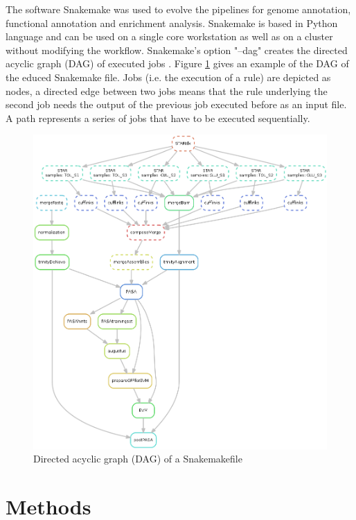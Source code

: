 \documentclass[12pt, a4paper]{report}
\begin{document}
The software Snakemake was used to evolve the pipelines for genome annotation, functional annotation and enrichment analysis. Snakemake is based in Python language and can be used on a single core workstation as well as on a cluster without modifying the workflow. 
Snakemake's option "--dag" creates the directed acyclic graph (DAG) of executed jobs \cite{Koster2012}.   
\newline
Figure \ref{fig:DAG} gives an example of the DAG of the educed Snakemake file. Jobs (i.e. the execution of a rule) are depicted as nodes, a directed edge between two jobs means that the rule underlying the second job needs the output of the previous job executed before as an input file. A path represents a series of jobs that have to be executed sequentially.
\begin{figure}[H]
	\centering	
	\includegraphics[width=430pt]{pics/DAG.png}
	\caption[Directed acyclic graph (DAG)]
	{Directed acyclic graph (DAG) of a Snakemakefile}
	\label{fig:DAG}
\end{figure}

\newpage
\setcounter{chapter}{2}\setcounter{section}{0}
\chapter*{Methods}
\end{document}
